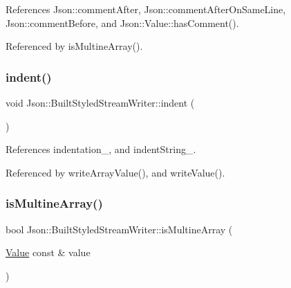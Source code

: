 References Json\+::comment\+After, Json\+::comment\+After\+On\+Same\+Line, Json\+::comment\+Before, and Json\+::\+Value\+::has\+Comment().



Referenced by is\+Multine\+Array().

\mbox{\label{structJson_1_1BuiltStyledStreamWriter_a73e09692a2cfbd6e67836b060dc34a9f_a73e09692a2cfbd6e67836b060dc34a9f}} 
\subsubsection{\texorpdfstring{indent()}{indent()}}
{\footnotesize\ttfamily void Json\+::\+Built\+Styled\+Stream\+Writer\+::indent (\begin{DoxyParamCaption}{ }\end{DoxyParamCaption})\hspace{0.3cm}{\ttfamily [private]}}



References indentation\+\_\+, and indent\+String\+\_\+.



Referenced by write\+Array\+Value(), and write\+Value().

\mbox{\label{structJson_1_1BuiltStyledStreamWriter_af423fd33b3d580506ea3efc53b05a077_af423fd33b3d580506ea3efc53b05a077}} 
\subsubsection{\texorpdfstring{is\+Multine\+Array()}{isMultineArray()}}
{\footnotesize\ttfamily bool Json\+::\+Built\+Styled\+Stream\+Writer\+::is\+Multine\+Array (\begin{DoxyParamCaption}\item[{\hyperlink{classJson_1_1Value}{Value} const \&}]{value }\end{DoxyParamCaption})\hspace{0.3cm}{\ttfamily [private]}}



